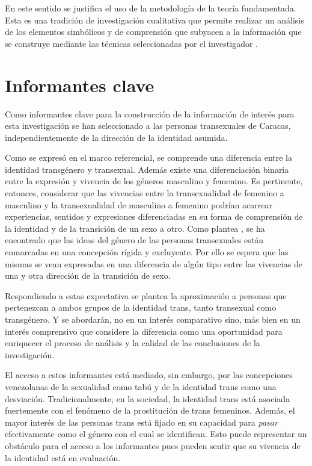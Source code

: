 
	En este sentido se justifica el uso de la metodología de la teoría fundamentada.
Esta es una tradición de investigación cualitativa que permite realizar un
análisis de los elementos simbólicos y de comprensión que subyacen a la
información que se construye mediante las técnicas seleccionadas por el
investigador \parencite{Glaser86}.

\section{Informantes clave}

	Como informantes clave para la construcción de la
información de interés para esta investigación se han seleccionado a las
personas transexuales de Caracas, independientemente de la dirección de la
identidad asumida.

	Como se expresó en el marco referencial, se comprende una diferencia entre la
identidad transgénero y transexual. Además existe una diferenciación binaria
entre la expresión y vivencia de los géneros masculino y femenino. Es
pertinente, entonces, considerar que las vivencias entre la transexualidad de
femenino a masculino y la transexualidad de masculino a femenino podrían
acarrear experiencias, sentidos y expresiones diferenciadas en su forma de
comprensión de la identidad y de la transición de un sexo a otro. Como plantea
\textcite[][p. 218]{BergeroMiguel2008}, se ha encontrado que las ideas del
género de las
personas transexuales están enmarcadas en una concepción rígida y excluyente.
Por ello se espera que las mismas se vean expresadas en una diferencia de algún
tipo entre las vivencias de una y otra dirección de la transición de sexo.

	Respondiendo a estas expectativa se plantea la aproximación a personas que
pertenezcan a ambos grupos de la identidad trans, tanto transexual como
transgénero. Y se abordarán,
no en un interés comparativo sino, más bien en un interés comprensivo que
considere la diferencia como una oportunidad para enriquecer el proceso de
análisis y la calidad de las conclusiones de la investigación.

	El acceso a estos informantes está mediado, sin embargo, por las concepciones
venezolanas de la sexualidad como tabú y de la identidad trans como una
desviación. Tradicionalmente, en la sociedad, la identidad trans está asociada
fuertemente con el fenómeno de la prostitución de trans femeninos. Además, el
mayor  interés de las personas trans está fijado en su capacidad para
\emph{pasar} efectivamente como el género con el cual se identifican. Esto puede
representar un obstáculo para el acceso a los informantes pues pueden sentir que
su vivencia de la identidad está en evaluación.

